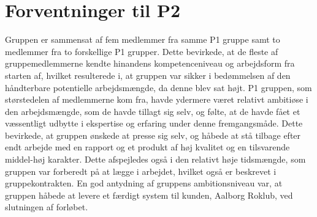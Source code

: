 \section{Forventninger til P2}

Gruppen er sammensat af fem medlemmer fra samme P1 gruppe samt to medlemmer fra to forskellige P1 grupper. Dette bevirkede, at de fleste af gruppemedlemmerne kendte hinandens kompetenceniveau og arbejdsform fra starten af, hvilket resulterede i, at gruppen var sikker i bedømmelsen af den håndterbare potentielle arbejdsmængde, da denne blev sat højt. P1 gruppen, som størstedelen af medlemmerne kom fra, havde ydermere været relativt ambitiøse i den arbejdsmængde, som de havde tillagt sig selv, og følte, at de havde fået et væssentligt udbytte i ekspertise og erfaring under denne fremgangsmåde. Dette bevirkede, at gruppen ønskede at presse sig selv, og håbede at stå tilbage efter endt arbejde med en rapport og et produkt af høj kvalitet og en tilsvarende middel-høj karakter. Dette afspejledes også i den relativt høje tidsmængde, som gruppen var forberedt på at lægge i arbejdet, hvilket også er beskrevet i gruppekontrakten. En god antydning af gruppens ambitionsniveau var, at gruppen håbede at levere et færdigt system til kunden, Aalborg Roklub, ved slutningen af forløbet.